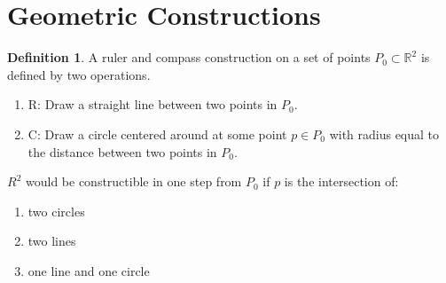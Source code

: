 \documentclass{article}
\theoremstyle{definition}
\newtheorem{definition}{Definition}
\theoremstyle{plain}
\theoremstyle{corollary}
\newtheorem{corollary}{Corollary}
\theoremstyle{lemma}
\begin{document}








\section{Geometric Constructions}

\begin{definition}
A ruler and compass construction on a set of points $P_0\subset\mathbb{R}^2$ is defined by two operations.
\begin{enumerate}
    \item R: Draw a straight line between two points in $P_0$.
    \item C: Draw a circle centered around at some point $p\in P_0$ with radius equal to the distance between two points in $P_0$.
\end{enumerate}
\end{definition}

$R^2$ would be constructible in one step from $P_0$ if $p$ is the intersection of:
\begin{enumerate}
    \item two circles
    \item two lines
    \item one line and one circle
\end{enumerate}
\end{document}
